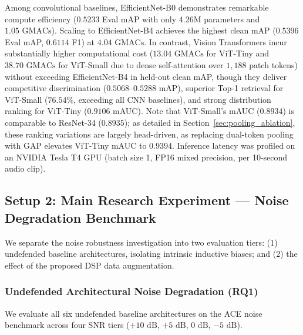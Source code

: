 \documentclass[11pt,a4paper]{article}
\begin{document}
Among convolutional baselines, EfficientNet-B0 demonstrates remarkable compute efficiency ($0.5233$ Eval mAP with only $4.26\text{M}$ parameters and $1.05\text{ GMACs}$). Scaling to EfficientNet-B4 achieves the highest clean mAP ($0.5396$ Eval mAP, $0.6114$ F1) at $4.04\text{ GMACs}$. In contrast, Vision Transformers incur substantially higher computational cost ($13.04\text{ GMACs}$ for ViT-Tiny and $38.70\text{ GMACs}$ for ViT-Small due to dense self-attention over $1,188$ patch tokens) without exceeding EfficientNet-B4 in held-out clean mAP, though they deliver competitive discrimination ($0.5068\text{--}0.5288$ mAP), superior Top-1 retrieval for ViT-Small ($76.54\%$, exceeding all CNN baselines), and strong distribution ranking for ViT-Tiny ($0.9106$ mAUC). Note that ViT-Small's mAUC ($0.8934$) is comparable to ResNet-34 ($0.8935$); as detailed in Section~\ref{sec:pooling_ablation}, these ranking variations are largely head-driven, as replacing dual-token pooling with GAP elevates ViT-Tiny mAUC to $0.9394$. Inference latency was profiled on an NVIDIA Tesla T4 GPU (batch size 1, FP16 mixed precision, per 10-second audio clip).

\subsection{Setup 2: Main Research Experiment --- Noise Degradation Benchmark}
We separate the noise robustness investigation into two evaluation tiers: (1) undefended baseline architectures, isolating intrinsic inductive biases; and (2) the effect of the proposed DSP data augmentation.

\subsubsection{Undefended Architectural Noise Degradation (RQ1)}
We evaluate all six undefended baseline architectures on the ACE noise benchmark across four SNR tiers ($+10\text{ dB}$, $+5\text{ dB}$, $0\text{ dB}$, $-5\text{ dB}$).
\end{document}
